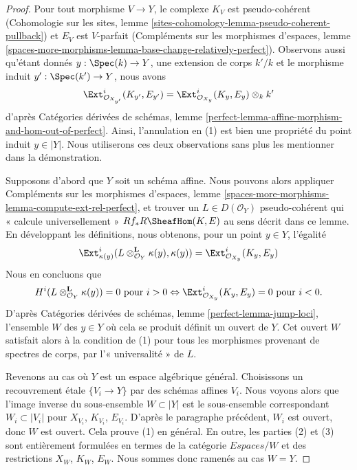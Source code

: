 \begin{proof}
Pour tout morphisme $V \to Y$, le complexe $K_V$ est pseudo-cohérent
(Cohomologie sur les sites, lemme
\ref{sites-cohomology-lemma-pseudo-coherent-pullback})
et $E_V$ est $V$-parfait (Compléments sur les morphismes d'espaces, lemme
\ref{spaces-more-morphisms-lemma-base-change-relatively-perfect}).
Observons aussi qu'étant donnés $y : \Spec(k) \to Y$, une extension de corps
$k'/k$ et le morphisme induit $y' : \Spec(k') \to Y$, nous avons
$$
\Ext^i_{\mathcal{O}_{X_{y'}}}(K_{y'}, E_{y'}) =
\Ext^i_{\mathcal{O}_{X_y}}(K_y, E_y) \otimes_k k'
$$
d'après Catégories dérivées de schémas, lemme
\ref{perfect-lemma-affine-morphism-and-hom-out-of-perfect}.
Ainsi, l'annulation en (1) est bien une propriété du point induit
$y \in |Y|$. Nous utiliserons ces deux observations sans plus les mentionner
dans la démonstration.

\medskip\noindent
Supposons d'abord que $Y$ soit un schéma affine. Nous pouvons alors appliquer
Compléments sur les morphismes d'espaces, lemme
\ref{spaces-more-morphisms-lemma-compute-ext-rel-perfect},
et trouver un $L \in D(\mathcal{O}_Y)$ pseudo-cohérent qui « calcule
universellement » $Rf_*R\SheafHom(K, E)$ au sens décrit dans ce lemme.
En développant les définitions, nous obtenons, pour un point $y \in Y$,
l'égalité
$$
\Ext^i_{\kappa(y)}(L \otimes_{\mathcal{O}_Y}^\mathbf{L} \kappa(y),
\kappa(y)) = \Ext^i_{\mathcal{O}_{X_y}}(K_y, E_y)
$$
Nous en concluons que
$$
H^i(L \otimes_{\mathcal{O}_Y}^\mathbf{L} \kappa(y)) = 0
\text{ pour } i > 0 \Leftrightarrow
\Ext^i_{\mathcal{O}_{X_y}}(K_y, E_y) = 0 \text{ pour }i < 0.
$$
D'après Catégories dérivées de schémas, lemme
\ref{perfect-lemma-jump-loci}, l'ensemble $W$ des $y \in Y$ où cela se produit
définit un ouvert de $Y$.
Cet ouvert $W$ satisfait alors à la condition de (1) pour tous les morphismes
provenant de spectres de corps, par l'« universalité » de $L$.

\medskip\noindent
Revenons au cas où $Y$ est un espace algébrique général.
Choisissons un recouvrement \'etale $\{V_i \to Y\}$ par des schémas affines
$V_i$. Nous voyons alors que l'image inverse du sous-ensemble $W \subset |Y|$
est le sous-ensemble correspondant $W_i \subset |V_i|$ pour
$X_{V_i}$, $K_{V_i}$, $E_{V_i}$.
D'après le paragraphe précédent, $W_i$ est ouvert, donc $W$ est ouvert.
Cela prouve (1) en général. En outre, les parties (2) et (3) sont entièrement
formulées en termes de la catégorie $\textit{Espaces}/W$ et des restrictions
$X_W$, $K_W$, $E_W$. Nous sommes donc ramenés au cas $W = Y$.


\end{proof}
